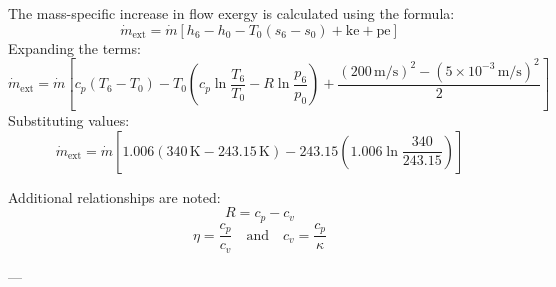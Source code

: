 The mass-specific increase in flow exergy is calculated using the formula:  
\[
\dot{m}_{\text{ext}} = \dot{m} \left[ h_6 - h_0 - T_0 (s_6 - s_0) + \text{ke} + \text{pe} \right]
\]  
Expanding the terms:  
\[
\dot{m}_{\text{ext}} = \dot{m} \left[ c_p (T_6 - T_0) - T_0 \left( c_p \ln \frac{T_6}{T_0} - R \ln \frac{p_6}{p_0} \right) + \frac{(200 \, \text{m/s})^2 - (5 \times 10^{-3} \, \text{m/s})^2}{2} \right]
\]  
Substituting values:  
\[
\dot{m}_{\text{ext}} = \dot{m} \left[ 1.006 (340 \, \text{K} - 243.15 \, \text{K}) - 243.15 \left( 1.006 \ln \frac{340}{243.15} \right) \right]
\]  

Additional relationships are noted:  
\[
R = c_p - c_v
\]  
\[
\eta = \frac{c_p}{c_v} \quad \text{and} \quad c_v = \frac{c_p}{\kappa}
\]  

---